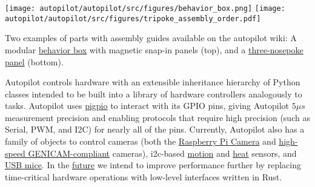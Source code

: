 \begin{marginfigure}[0cm]
\texttt{[image: autopilot/autopilot/src/figures/behavior\_box.png]}
\texttt{[image: autopilot/autopilot/src/figures/tripoke\_assembly\_order.pdf]}
\caption{Two examples of parts with assembly guides available on the autopilot wiki: A modular \href{https://wiki.auto-pi-lot.com/index.php/Autopilot_Behavior_Box}{behavior box} with magnetic snap-in panels (top), and a \href{https://wiki.auto-pi-lot.com/index.php/Autopilot_Tripoke}{three-nosepoke panel} (bottom).}
\label{fig:pokeport}
\end{marginfigure}%

Autopilot controls hardware with an extensible inheritance hierarchy of Python classes intended to be built into a library of hardware controllers analogously to tasks. Autopilot uses \href{http://abyz.me.uk/rpi/pigpio/}{pigpio} to interact with its GPIO pins, giving Autopilot $5 \mu s$ measurement precision and enabling protocols that require high precision (such as Serial, PWM, and I2C) for nearly all of the pins.  Currently, Autopilot also has a family of objects to control cameras (both the \href{https://docs.auto-pi-lot.com/en/latest/hardware/cameras.html\#autopilot.hardware.cameras.PiCamera}{Raspberry Pi Camera} and \href{https://docs.auto-pi-lot.com/en/latest/hardware/cameras.html\#autopilot.hardware.cameras.Camera_Spinnaker}{high-speed GENICAM-compliant} cameras), i2c-based \href{https://docs.auto-pi-lot.com/en/latest/hardware/i2c.html\#autopilot.hardware.i2c.I2C_9DOF}{motion} and \href{https://docs.auto-pi-lot.com/en/latest/hardware/i2c.html\#autopilot.hardware.i2c.MLX90640}{heat} sensors, and \href{https://docs.auto-pi-lot.com/en/latest/hardware/usb.html\#autopilot.hardware.usb.Wheel}{USB mice}.  In the \hyperref[sec:future]{future} we intend to improve performance further by replacing time-critical hardware operations with low-level interfaces written in Rust.

